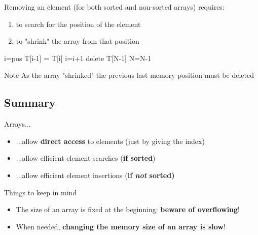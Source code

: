 \documentclass{beamer}[10pt, usepdftitle=false, handout]
\begin{document}
	\begin{frame}
	
	Removing an element (for both sorted and non-sorted arrays) requires:
	
	\begin{enumerate}
	\item {to search for the position of the element}
	\item {to "shrink" the array from that position}	
	\end{enumerate}	
	
	\begin{center}    
    \scalebox{0.75} {
    \begin{algorithm}[H] 
    i=pos\;
     {
		T[i-1] = T[i]\;
		i=i+1\;		    
	}
	delete T[N-1]\;
	N=N-1\;
    \end{algorithm}	
	}
	\end{center}		
	
	\begin{block}{Note}
	As the array "shrinked" the previous last memory position must be deleted	
	\end{block}
	\end{frame}	
	
	\subsection{Summary}	
	
	\begin{frame}

	Arrays...
	
	\begin{itemize}
		\item {...allow \textbf{direct access} to elements (just by giving the index)}
		\item {...allow efficient element searches (\textbf{if sorted})}
		\item {...allow efficient element insertions (\textbf{if \textit{not} sorted)}}
	\end{itemize}		
	
	\pause
	
	\begin{alertblock}{Things to keep in mind}
	\begin{itemize}
	\item {The size of an array is fixed at the beginning: \textbf{beware of overflowing}!}
	\item {When needed, \textbf{changing the memory size of an array is slow}!}	
	\end{itemize}	
	\end{alertblock}	
	
	\end{frame}
	
\end{document}
